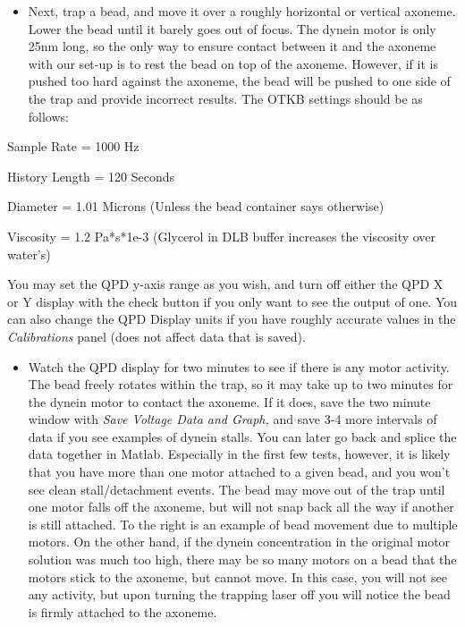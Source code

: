 \documentclass{../lab}
\begin{document}
\begin{itemize}
    \item Next, trap a bead, and move it over a roughly horizontal or vertical axoneme. Lower the bead until it barely goes out of focus. The dynein motor is only 25nm long, so the only way to ensure contact between it and the axoneme with our set-up is to rest the bead on top of the axoneme. However, if it is pushed too hard against the axoneme, the bead will be pushed to one side of the trap and provide incorrect results. The OTKB settings should be as follows:

\end{itemize}

Sample Rate = 1000 Hz

History Length = 120 Seconds

Diameter = 1.01 Microns (Unless the bead container says otherwise)

Viscosity = 1.2 Pa*s*1e-3 (Glycerol in DLB buffer increases the viscosity over water's)

You may set the QPD y-axis range as you wish, and turn off either the QPD X or Y display with the check button if you only want to see the output of one. You can also change the QPD Display units if you have roughly accurate values in the \emph{Calibrations} panel (does not affect data that is saved).

\begin{itemize}
    \item Watch the QPD display for two minutes to see if there is any motor activity. The bead freely rotates within the trap, so it may take up to two minutes for the dynein motor to contact the axoneme. If it does, save the two minute window with \emph{Save Voltage Data and Graph,} and save 3-4 more intervals of data if you see examples of dynein stalls. You can later go back and splice the data together in Matlab. Especially in the first few tests, however, it is likely that you have more than one motor attached to a given bead, and you won't see clean stall/detachment events. The bead may move out of the trap until one motor falls off the axoneme, but will not snap back all the way if another is still attached. To the right is an example of bead movement due to multiple motors. On the other hand, if the dynein concentration in the original motor solution was much too high, there may be so many motors on a bead that the motors stick to the axoneme, but cannot move. In this case, you will not see any activity, but upon turning the trapping laser off you will notice the bead is firmly attached to the axoneme.

\end{itemize}
\end{document}
